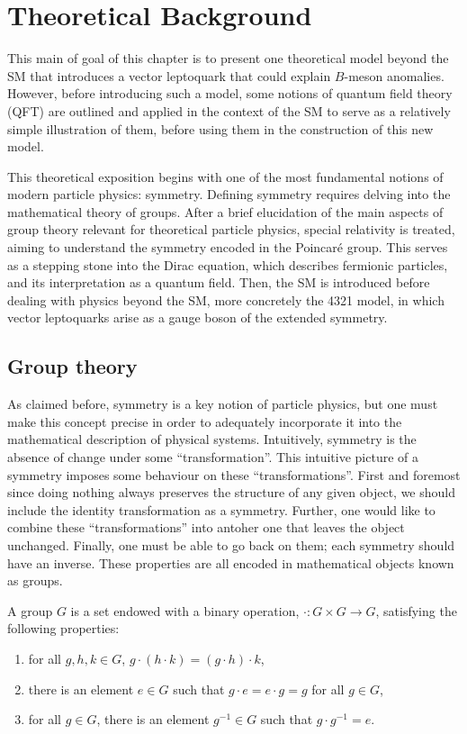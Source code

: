 \chapter{Theoretical Background}
\label{ch:theory}
\label{ch:chapter2}

This main of goal of this chapter is to present one theoretical model beyond the SM that introduces a vector leptoquark that could explain $B$-meson anomalies. However, before introducing such a model, some notions of quantum field theory (QFT) are outlined and applied in the context of the SM to serve as a relatively simple illustration of them, before using them in the construction of this new model.

This theoretical exposition begins with one of the most fundamental notions of modern particle physics: symmetry. Defining symmetry requires delving into the mathematical theory of groups. After a brief elucidation of the main aspects of group theory relevant for theoretical particle physics, special relativity is treated, aiming to understand the symmetry encoded in the Poincaré group. This serves as a stepping stone into the Dirac equation, which describes fermionic particles, and its interpretation as a quantum field. Then, the SM is introduced before dealing with physics beyond the SM, more concretely the 4321 model, in which vector leptoquarks arise as a gauge boson of the extended symmetry.

\section{Group theory}

As claimed before, symmetry is a key notion of particle physics, but one must make this concept precise in order to adequately incorporate it into the mathematical description of physical systems. Intuitively, symmetry is the absence of change under some ``transformation''. This intuitive picture of a symmetry imposes some behaviour on these ``transformations''. First and foremost since doing nothing always preserves the structure of any given object, we should include the identity transformation as a symmetry. Further, one would like to combine these ``transformations'' into antoher one that leaves the object unchanged. Finally, one must be able to go back on them; each symmetry should have an inverse. These properties are all encoded in mathematical objects known as groups.

\begin{newdef}
A group $G$ is a set endowed with a binary operation, $\cdot : G\times G \rightarrow G$, satisfying the following properties:
\begin{enumerate}
    \item for all $g,h,k\in G$, $g\cdot (h\cdot k) = (g\cdot h) \cdot k$,
    \item there is an element $e\in G$ such that $g\cdot e = e\cdot g = g$ for all $g\in G$,
    \item for all $g\in G$, there is an element $g^{-1} \in G$ such that $g \cdot g^{-1} = e$.
\end{enumerate}
\end{newdef}

